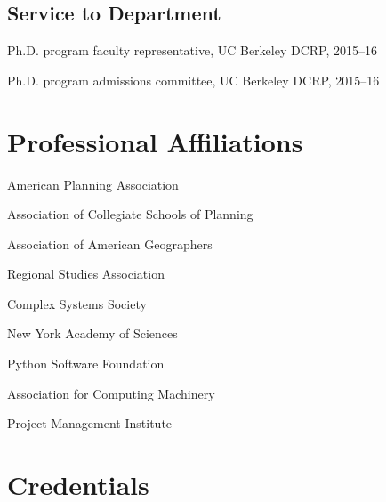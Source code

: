 \documentclass[12pt,letterpaper]{report}
\newcommand{\listitemspace}{0.15em}
\renewenvironment{itemize}
{\begin{list}{}{\setlength{\leftmargin}{0em}
			\setlength{\parskip}{0em}
			\setlength{\itemsep}{\listitemspace}
			\setlength{\parsep}{\listitemspace}}}
	{\end{list}}
\begin{document}
	\subsection*{Service to Department}
	
	\begin{itemize}
		
		\item Ph.D. program faculty representative, UC Berkeley DCRP, 2015--16
		
		\item Ph.D. program admissions committee, UC Berkeley DCRP, 2015--16
		
	\end{itemize}
	
	
	
	\section*{Professional Affiliations}
	
	\begin{itemize}
		
		\item American Planning Association
		
		\item Association of Collegiate Schools of Planning
		
		\item Association of American Geographers
		
		\item Regional Studies Association
		
		\item Complex Systems Society
		
		\item New York Academy of Sciences
		
		\item Python Software Foundation
		
		\item Association for Computing Machinery
		
		\item Project Management Institute
		
	\end{itemize}
	
	
	
	\section*{Credentials}
	
\end{document}
